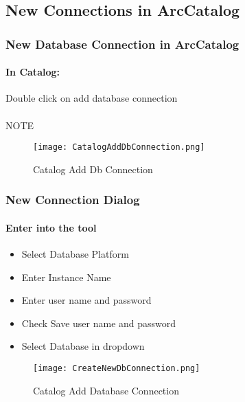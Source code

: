 \documentclass[class=article , crop=false, titlepage, twoside, multi={itemize, figure, verbatim}, float=false]{standalone}
\title{}  %
\begin{document}


\ifstandalone
\maketitle %
\tableofcontents %
\clearpage
\fi

\subsection{New Connections in ArcCatalog}
\medskip
\subsubsection[New Database Connection in ArcCatalog]{\Large New Database Connection in ArcCatalog}
\paragraph{In Catalog: \texorpdfstring{\\}{}}
Double click on add database connection
\paragraph*{}NOTE
\begin{figure}[h!]
\centering
    \texttt{[image: CatalogAddDbConnection.png]}
\caption{Catalog Add Db Connection}
\end{figure}
\clearpage
\subsubsection[New Connection Dialog]{\Large New Connection Dialog}
\paragraph{Enter into the tool \texorpdfstring{\\}{}}
\begin{itemize}
  \item Select Database Platform
  \item Enter Instance Name
  \item Enter user name and password
  \item Check Save user name and password
  \item Select Database in dropdown
\end{itemize}
\begin{figure}[h!]
\centering
    \texttt{[image: CreateNewDbConnection.png]}
\caption{Catalog Add Database Connection}
\end{figure}
\clearpage
\end{document}
